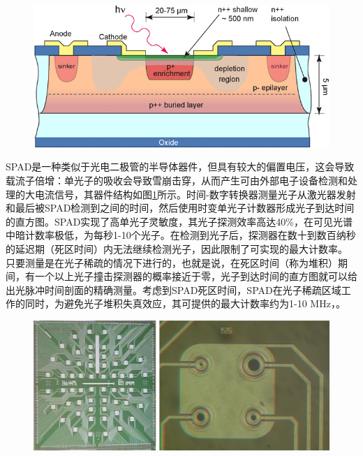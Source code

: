 \documentclass[master]{shtthesis}             %
\begin{document}
\begin{figure}[!tb]
  \centering
  \includegraphics[width=\textwidth]{figure/spad_pixel_struct.jpg}
  \label{fig:spad_pixel}
\end{figure}

SPAD是一种类似于光电二极管的半导体器件，但具有较大的偏置电压，这会导致载流子倍增：单光子的吸收会导致雪崩击穿，从而产生可由外部电子设备检测和处理的大电流信号，其器件结构如图\ref{fig:spad_pixel}所示\citep{zappa2007principles}。时间-数字转换器测量光子从激光器发射和最后被SPAD检测到之间的时间，然后使用时变单光子计数器形成光子到达时间的直方图\citep{becker2005advanced}。SPAD实现了高单光子灵敏度，其光子探测效率高达40\%，在可见光谱中暗计数率极低，为每秒1-10个光子。在检测到光子后，探测器在数十到数百纳秒的延迟期（死区时间）内无法继续检测光子，因此限制了可实现的最大计数率。
只要测量是在光子稀疏的情况下进行的，也就是说，在死区时间（称为堆积）期间，有一个以上光子撞击探测器的概率接近于零，光子到达时间的直方图就可以给出光脉冲时间剖面的精确测量。考虑到SPAD死区时间，SPAD在光子稀疏区域工作的同时，为避免光子堆积失真效应，其可提供的最大计数率约为1-10 MHz，。

\begin{figure}[!tb]
  \centering
  \includegraphics[width=\textwidth]{figure/spad_array.jpg}
  \label{fig:spad_array}
\end{figure}
\end{document}
